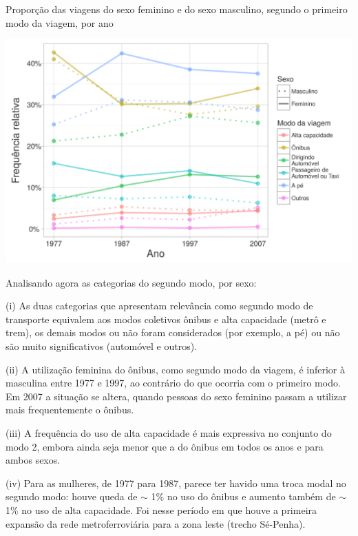 \begin{grafico}[htb]%
    \caption{\label{graf:freq-modo1}Proporção das viagens do sexo feminino e do sexo masculino, segundo o primeiro modo da viagem, por ano}%
    \begin{center}%
        \includegraphics[width=1\textwidth]{./imagens/freq-modo1.png}%
    \end{center}%
\end{grafico}%

Analisando agora as categorias do segundo modo, por sexo:
\begin{compactitem}[]
\item (i)  As duas categorias que apresentam relevância como segundo modo de transporte equivalem aos modos coletivos ônibus e alta capacidade (metrô e trem), os demais modos ou não foram considerados (por exemplo, a pé) ou não são muito significativos (automóvel e outros).
\item (ii) A utilização feminina do ônibus, como segundo modo da viagem, é inferior à masculina entre 1977 e 1997, ao contrário do que ocorria com o primeiro modo. Em 2007 a situação se altera, quando pessoas do sexo feminino passam a utilizar mais frequentemente o ônibus.
\item (iii) A frequência do uso de alta capacidade é mais expressiva no conjunto do modo 2, embora ainda seja menor que a do ônibus em todos os anos e para ambos sexos.
\item(iv) Para as mulheres, de 1977 para 1987, parece ter havido uma troca modal no segundo modo: houve queda de $\sim$ 1\% no uso do ônibus e aumento também de $\sim$ 1\% no uso de alta capacidade. Foi nesse período em que houve a primeira expansão da rede metroferroviária para a zona leste (trecho Sé-Penha).
\end{compactitem}

